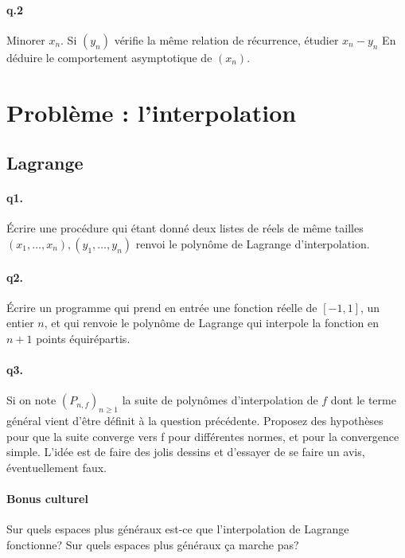 \documentclass[10pt,a4paper]{article}
\begin{document}
\paragraph{q.2} 
Minorer $x_n$. Si $(y_n)$ vérifie la même relation de récurrence, étudier $x_n-y_n$
En déduire le comportement asymptotique de $(x_n)$.


%
%
%
%
%
%
\section{Problème : l'interpolation}
\subsection{Lagrange}
\paragraph{q1.} Écrire une procédure qui étant donné deux listes de réels de même tailles $(x_1,\dots,x_n),(y_1,\dots,y_n)$ renvoi 
le polynôme de Lagrange d'interpolation.
\paragraph{q2.} Écrire un programme qui prend en entrée une fonction réelle de $[-1,1]$, un entier $n$, et qui renvoie le polynôme de Lagrange qui interpole la fonction en $n+1$ points équirépartis.
\paragraph{q3.} Si on note $(P_{n,f})_{n\geq1}$ la suite de polynômes d'interpolation de $f$ dont le terme général vient d'être définit à la question précédente. Proposez des hypothèses pour que la suite converge vers f pour différentes normes, et pour la convergence simple. L'idée est de faire des jolis dessins et d'essayer de se faire un avis, éventuellement faux.

\paragraph{Bonus culturel} Sur quels espaces plus généraux est-ce que l'interpolation de Lagrange fonctionne? Sur quels espaces plus généraux ça marche pas?
\end{document}
